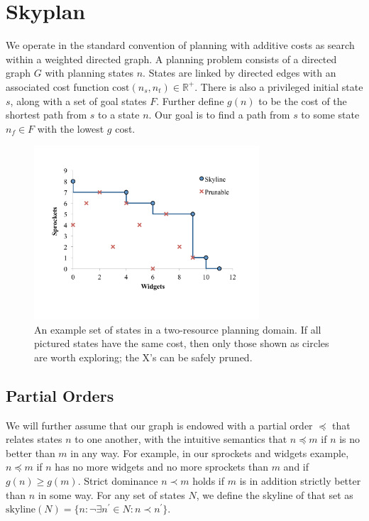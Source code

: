 \documentclass[letterpaper]{article}
\theoremstyle{plain} \newtheorem{theorem}{Theorem} \newtheorem{proposition}{Proposition} \newtheorem{lemma}{Lemma}
\theoremstyle{definition} \newtheorem{definition}{Definition} \newtheorem{conjecture}{Conjecture} \newtheorem*{example}{Example}
\theoremstyle{remark} \newtheorem*{remark}{Remark} \newtheorem*{note}{Note} \newtheorem{case}{Case}
\begin{document}
\section{Skyplan}


We operate in the standard convention of planning with additive
costs as search within a weighted directed graph.  A planning problem
consists of a directed graph $G$ with planning states $n$. States are linked by directed edges with an associated
cost function $\mathrm{cost}(n_s,n_t) \in \mathbb R^+$.  There is
also a privileged initial state $s$, along with a set of goal states
$F$.  Further define $g(n)$ to be the cost of the shortest path from $s$
to a state $n$.  Our goal is to find a path from $s$ to some state
$n_f \in F$ with the lowest $g$ cost.


\begin{figure}
	\begin{center}
	\includegraphics[width=3.3in]{skyline2d.pdf}
\end{center}
  \caption{An example set of states in a two-resource planning domain. If
all pictured states have the same cost, then only those shown as circles are
worth exploring; the X's can be safely pruned.}
  \label{fig:skyline}
\end{figure}


\subsection{Partial Orders}

We will further assume that our graph is endowed with a partial
order $\preceq$ that relates states $n$ to one another, with the
intuitive semantics that $n \preceq m$ if $n$ is no better than $m$
in any way. For example, in our sprockets and widgets example, $n
\preceq m$ if $n$ has no more widgets and no more sprockets than
$m$ and if $g(n) \ge g(m)$. Strict dominance $n \prec m$ holds if
$m$ is in addition strictly better than $n$ in some way.  For any
set of states $N$, we define the skyline of that set as
$\textrm{skyline}(N)=\{n: \neg\exists n^\prime \in N: n \prec
n^\prime\}$. 
\end{document}
